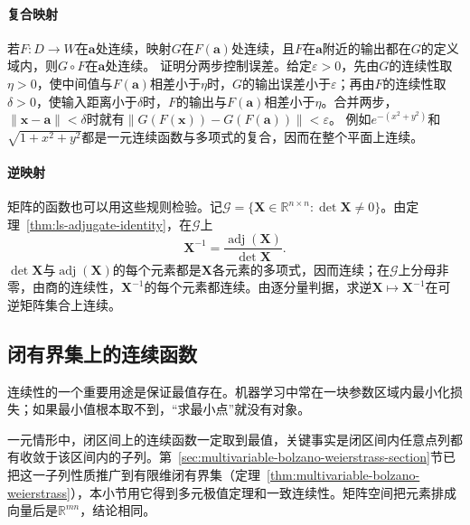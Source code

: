 \paragraph{复合映射}
若$F:D\to W$在$\bm a$处连续，映射$G$在$F(\bm a)$处连续，且$F$在$\bm a$附近的输出都在$G$的定义域内，则$G\circ F$在$\bm a$处连续。
证明分两步控制误差。给定$\varepsilon>0$，先由$G$的连续性取$\eta>0$，使中间值与$F(\bm a)$相差小于$\eta$时，$G$的输出误差小于$\varepsilon$；再由$F$的连续性取$\delta>0$，使输入距离小于$\delta$时，$F$的输出与$F(\bm a)$相差小于$\eta$。合并两步，$\lVert\bm x-\bm a\rVert<\delta$时就有$\lVert G(F(\bm x))-G(F(\bm a))\rVert<\varepsilon$。
例如$e^{-(x^2+y^2)}$和$\sqrt{1+x^2+y^2}$都是一元连续函数与多项式的复合，因而在整个平面上连续。

\paragraph{逆映射}
矩阵的函数也可以用这些规则检验。记$\mathcal G=\{\bm X\in\mathbb R^{n\times n}:\det\bm X\neq0\}$。由定理~\ref{thm:ls-adjugate-identity}，在$\mathcal G$上
\[
 \bm X^{-1}=\frac{\operatorname{adj}(\bm X)}{\det\bm X}.
\]
$\det\bm X$与$\operatorname{adj}(\bm X)$的每个元素都是$\bm X$各元素的多项式，因而连续；在$\mathcal G$上分母非零，由商的连续性，$\bm X^{-1}$的每个元素都连续。由逐分量判据，求逆$\bm X\mapsto\bm X^{-1}$在可逆矩阵集合上连续。

\subsection{闭有界集上的连续函数}
\label{sec:multivariable-closed-bounded-continuous}

连续性的一个重要用途是保证最值存在。机器学习中常在一块参数区域内最小化损失；如果最小值根本取不到，“求最小点”就没有对象。

一元情形中，闭区间上的连续函数一定取到最值，关键事实是闭区间内任意点列都有收敛于该区间内的子列。第~\ref{sec:multivariable-bolzano-weierstrass-section}节已把这一子列性质推广到有限维闭有界集（定理~\ref{thm:multivariable-bolzano-weierstrass}），本小节用它得到多元极值定理和一致连续性。矩阵空间把元素排成向量后是$\mathbb R^{mn}$，结论相同。


